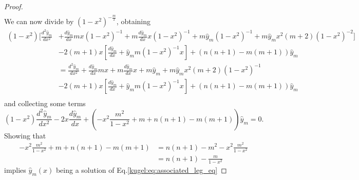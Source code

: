 \begin{proof}
\begin{align*}
    \end{align*}
    We can now divide by $(1-x^2)^{-\frac{m}{2}}$, obtaining
    \begin{align*}
    (1-x^2)\biggl[\frac{d^2\hat{y}_m}{dx^2} &+ \frac{d\hat{y}_m}{dx}mx (1-x^2)^{-1} + m\frac{d\hat{y}_m}{dx}x (1-x^2)^{-1} + m\hat{y}_m  (1-x^2)^{-1} + m\hat{y}_m x^2(m+2)(1-x^2)^{-2}\biggr] \\
    &-2(m+1)x\left[  \frac{d\hat{y}_m}{dx} + \hat{y}_mm(1-x^2)^{-1}x \right] + (n(n+1)-m(m+1))\hat{y}_m\\
    &= \frac{d^2\hat{y}_m}{dx^2} + \frac{d\hat{y}_m}{dx}mx + m\frac{d\hat{y}_m}{dx}x + m\hat{y}_m + m\hat{y}_m x^2(m+2)(1-x^2)^{-1} \\
    &-2(m+1)x\left[  \frac{d\hat{y}_m}{dx} + \hat{y}_mm(1-x^2)^{-1}x \right] + (n(n+1)-m(m+1))\hat{y}_m\\
    \end{align*}
    and collecting some terms
    \begin{equation*}
    (1-x^2)\frac{d^2\hat{y}_m}{dx^2} - 2x\frac{d\hat{y}_m}{dx} + \left( -x^2 \frac{m^2}{1-x^2} + m+n(n+1)-m(m+1)\right)\hat{y}_m=0.
    \end{equation*}
    Showing that 
    \begin{align*}
    -x^2 \frac{m^2}{1-x^2} + m+n(n+1)-m(m+1) &= n(n+1)- m^2 -x^2 \frac{m^2}{1-x^2} \\
    &= n(n+1)- \frac{m}{1-x^2}
    \end{align*}
    implies $\hat{y}_m(x)$ being a solution of Eq.\eqref{kugel:eq:associated_leg_eq}
\end{proof}
